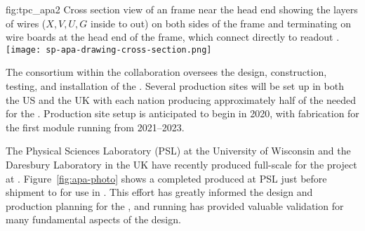 \begin{dunefigure}{fig:tpc_apa2}
{Cross section view of an  frame near the head end showing the layers of wires ($X,V,U,G$ inside to out) on both sides of the frame and terminating on wire boards at the head end of the frame, which connect directly to  readout .} 
\texttt{[image: sp-apa-drawing-cross-section.png]} 
\end{dunefigure} 


The  consortium within the  collaboration oversees the design, construction, testing, and installation of the . Several  production sites will be set up in both the US and the UK with each nation producing approximately half of the  needed for the %
.  Production site setup is anticipated to begin in 2020, with  fabrication for the first \nominalmodsize {} module running from 2021--2023.  

The Physical Sciences Laboratory (PSL) at the University of Wisconsin and the Daresbury Laboratory in the UK have recently produced full-scale  for the  project at . Figure~\ref{fig:apa-photo} shows a completed  produced at PSL just before shipment to  for use in . This effort has greatly informed the design and production planning for the  , and  running has provided valuable validation for many fundamental aspects of the   design. 


